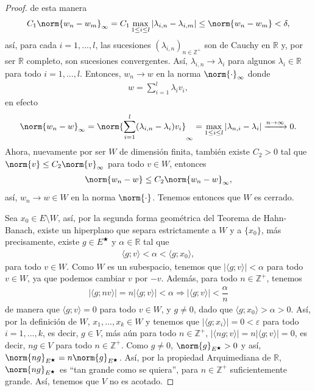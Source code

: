 \begin{proof}
    de esta manera
    \begin{align*}
        C_1\norm{w_n-w_m}_\infty=C_1\max_{1\leq i\leq l}|\lambda_{i,n}-\lambda_{i,m}|\leq \norm{w_n-w_m}<\delta,
    \end{align*}
    así, para cada $i=1,...,l$, las sucesiones $(\lambda_{i,n})_{n \in \mathbb{Z}^+}$ son de Cauchy en $\mathbb{R}$ y, por ser $\mathbb{R}$ completo, son sucesiones convergentes. Así, $\lambda_{i,n}\to \lambda_i$ para algunos $\lambda_i \in \mathbb{R}$ para todo $i=1,...,l$. Entonces, $w_n\to w$ en la norma $\norm{\cdot}_\infty$ donde 
    \begin{align*}
        w=\sum_{i=1}^l \lambda_i v_i,
    \end{align*}
    en efecto
    \begin{align*}
        \norm{w_n-w}_\infty=\norm{\sum_{i=1}^l (\lambda_{i,n}-\lambda_i)v_i}_\infty=\max_{1\leq i \leq l}|\lambda_{n,i}-\lambda_i|\xrightarrow{n\to \infty} 0.
    \end{align*}
    Ahora, nuevamente por ser $W$ de dimensión finita, también existe $C_2>0$ tal que $\norm{v}\leq C_2\norm{v}_\infty$ para todo $v \in W$, entonces 
    \begin{align*}
        \norm{w_n-w}\leq C_2\norm{w_n-w}_\infty,
    \end{align*}
    así, $w_n\to w \in W$ en la norma $\norm{\cdot}$. Tenemos entonces que $W$ es cerrado.
    
    Sea $x_0 \in E\setminus W$, así, por la segunda forma geométrica del Teorema de Hahn-Banach, existe un hiperplano que separa estrictamente a $W$ y a $\{x_0\}$, más precisamente, existe $g \in E^\bigstar$ y $\alpha\in \mathbb{R}$ tal que 
    \begin{align*}
        \langle g;v\rangle<\alpha<\langle g;x_0\rangle,
    \end{align*}
    para todo $v \in W$. Como $W$ es un subespacio, tenemos que $|\langle g;v\rangle|<\alpha$ para todo $v \in W$, ya que podemos cambiar $v$ por $-v$. Además, para todo $n \in \mathbb{Z}^+$, tenemos
    \begin{align*}
        |\langle g;nv\rangle|=n|\langle g;v\rangle|<\alpha \Longrightarrow |\langle g;v\rangle|<\dfrac{\alpha}{n}
    \end{align*}
    de manera que $\langle g;v\rangle=0$ para todo $v \in W$, y $g\neq 0$, dado que $\langle g;x_0\rangle>\alpha>0$. Así, por la definición de $W$, $x_1,...,x_k\in W$ y tenemos que $|\langle g;x_i\rangle|=0<\varepsilon$ para todo $i=1,...,k$, es decir, $g \in V$, más aún para todo $n\in \mathbb{Z}^+$, $|\langle ng;v\rangle|=n|\langle g;v\rangle|=0$, es decir, $ng \in V$ para todo $n \in \mathbb{Z}^+$. Como $g\neq 0$, $\norm{g}_{E^\bigstar}>0$ y así, $\norm{ng}_{E^\bigstar}=n\norm{g}_{E^\bigstar}$. Así, por la propiedad Arquimediana de $\mathbb{R}$, $\norm{ng}_{E^\bigstar}$ es ``tan grande como se quiera'', para $n\in \mathbb{Z}^+$ suficientemente grande. Así, tenemos que $V$ no es acotado.
    
\end{proof}

